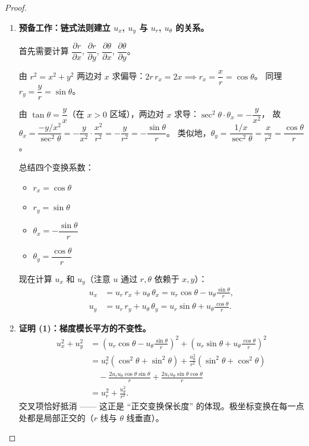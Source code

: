 \documentclass[lang=cn,11pt]{elegantbook}
\begin{document}
\begin{proof}
\begin{enumerate}
  \item \textbf{预备工作：链式法则建立 $u_x$, $u_y$ 与 $u_r$, $u_\theta$ 的关系。}
  
  首先需要计算 $\dfrac{\partial r}{\partial x}$, $\dfrac{\partial r}{\partial y}$, $\dfrac{\partial\theta}{\partial x}$, $\dfrac{\partial\theta}{\partial y}$。
  
  由 $r^2=x^2+y^2$ 两边对 $x$ 求偏导：$2r\,r_x=2x \implies r_x=\dfrac{x}{r}=\cos\theta$。
  同理 $r_y=\dfrac{y}{r}=\sin\theta$。
  
  由 $\tan\theta=\dfrac{y}{x}$（在 $x>0$ 区域），两边对 $x$ 求导：$\sec^2\theta\cdot\theta_x=-\dfrac{y}{x^2}$，
  故 $\theta_x=\dfrac{-y/x^2}{\sec^2\theta} =-\dfrac{y}{x^2}\cdot\dfrac{x^2}{r^2}=-\dfrac{y}{r^2} =-\dfrac{\sin\theta}{r}$。
  类似地，$\theta_y=\dfrac{1/x}{\sec^2\theta} = \dfrac{x}{r^2} = \dfrac{\cos\theta}{r}$。
  
  总结四个变换系数：
  \begin{itemize}
      \item $r_x=\cos\theta$
      \item $r_y=\sin\theta$
      \item $\theta_x=-\dfrac{\sin\theta}{r}$
      \item $\theta_y=\dfrac{\cos\theta}{r}$
  \end{itemize}
  
  现在计算 $u_x$ 和 $u_y$（注意 $u$ 通过 $r,\theta$ 依赖于 $x,y$）：
  \begin{align}
  u_x&=u_r\,r_x+u_\theta\,\theta_x
  =u_r\cos\theta-u_\theta\frac{\sin\theta}{r}, \tag{A}\\[6pt]
  u_y&=u_r\,r_y+u_\theta\,\theta_y
  =u_r\sin\theta+u_\theta\frac{\cos\theta}{r}. \tag{B}
  \end{align}

  \item \textbf{证明 (1)：梯度模长平方的不变性。}
  \begin{align*}
  u_x^2+u_y^2
  &=\left(u_r\cos\theta-u_\theta\frac{\sin\theta}{r}\right)^2
   +\left(u_r\sin\theta+u_\theta\frac{\cos\theta}{r}\right)^2\\[6pt]
  &=u_r^2(\cos^2\theta+\sin^2\theta)
  +\frac{u_\theta^2}{r^2}(\sin^2\theta+\cos^2\theta)\\[4pt]
  &\quad-\frac{2u_ru_\theta\cos\theta\sin\theta}{r}
  +\frac{2u_ru_\theta\sin\theta\cos\theta}{r}\\[6pt]
  &=u_r^2+\frac{u_\theta^2}{r^2}.
  \end{align*}
  交叉项恰好抵消 —— 这正是 ``正交变换保长度'' 的体现。极坐标变换在每一点处都是局部正交的（$r$ 线与 $\theta$ 线垂直）。


\end{enumerate}
\end{proof}
\end{document}
